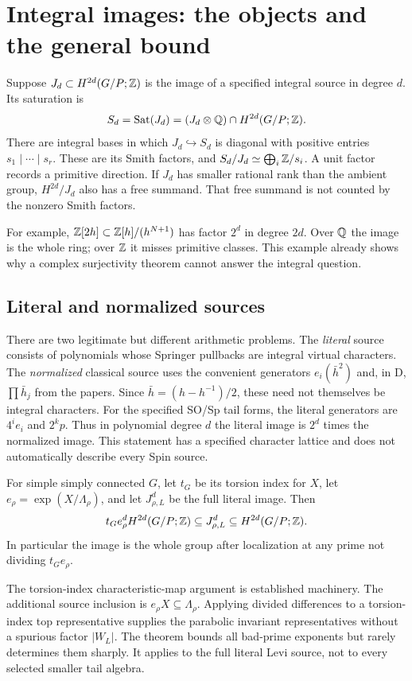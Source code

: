 \section{Integral images: the objects and the general bound}
Suppose $J_d\subset H^{2d}(G/P;\mathbb Z)$ is the image of a specified integral source in degree $d$. Its saturation is
\[
 S_d=\operatorname{Sat}(J_d)=(J_d\otimes\mathbb Q)\cap H^{2d}(G/P;\mathbb Z).
\]
There are integral bases in which $J_d\hookrightarrow S_d$ is diagonal with positive entries $s_1\mid\cdots\mid s_r$. These are its Smith factors, and
$S_d/J_d\simeq\bigoplus_i\mathbb Z/s_i$. A unit factor records a primitive direction. If $J_d$ has smaller rational rank than the ambient group, $H^{2d}/J_d$ also has a free summand. That free summand is not counted by the nonzero Smith factors.

For example, $\mathbb Z[2h]\subset\mathbb Z[h]/(h^{N+1})$ has factor $2^d$ in degree $2d$. Over $\mathbb Q$ the image is the whole ring; over $\mathbb Z$ it misses primitive classes. This example already shows why a complex surjectivity theorem cannot answer the integral question.

\subsection{Literal and normalized sources}
There are two legitimate but different arithmetic problems. The \emph{literal} source consists of polynomials whose Springer pullbacks are integral virtual characters. The \emph{normalized} classical source uses the convenient generators $e_i(\bar h^2)$ and, in D, $\prod\bar h_j$ from the papers. Since $\bar h=(h-h^{-1})/2$, these need not themselves be integral characters. For the specified SO/Sp tail forms, the literal generators are $4^i e_i$ and $2^k p$. Thus in polynomial degree $d$ the literal image is $2^d$ times the normalized image. This statement has a specified character lattice and does not automatically describe every Spin source.

\begin{theorem}
For simple simply connected $G$, let $t_G$ be its torsion index for $X$, let $e_\rho=\exp(X/\Lambda_\rho)$, and let $J_{\rho,L}^d$ be the full literal image. Then
\[
 t_G e_\rho^d H^{2d}(G/P;\mathbb Z)\subseteq J_{\rho,L}^d
 \subseteq H^{2d}(G/P;\mathbb Z).
\]
In particular the image is the whole group after localization at any prime not dividing $t_Ge_\rho$.
\end{theorem}
The torsion-index characteristic-map argument is established machinery. The additional source inclusion is $e_\rho X\subseteq\Lambda_\rho$. Applying divided differences to a torsion-index top representative supplies the parabolic invariant representatives without a spurious factor $|W_L|$. The theorem bounds all bad-prime exponents but rarely determines them sharply. It applies to the full literal Levi source, not to every selected smaller tail algebra.

